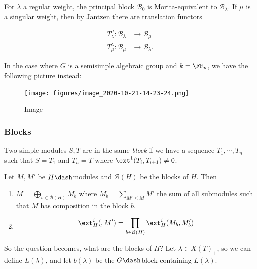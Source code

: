 For \(\lambda\) a regular weight, the principal block \(\mathcal{B}_0\)
is Morita-equivalent to \(\mathcal{B}_\lambda\). If \(\mu\) is a
singular weight, then by Jantzen there are translation functors

\begin{align*}  
T_\lambda^\mu: \mathcal{B}_\lambda &\to \mathcal{B}_\mu \\
T_\mu^\lambda: \mathcal{B}_\mu &\to \mathcal{B}_\lambda
.\end{align*}

In the case where \(G\) is a semisimple algebraic group and
\(k = \bar{\FF}_p\), we have the following picture instead:

\begin{figure}
\centering
\texttt{[image: figures/image\_2020-10-21-14-23-24.png]}
\caption{Image}
\end{figure}

\hypertarget{blocks}{%
\subsubsection{Blocks}\label{blocks}}

Two simple modules \(S, T\) are in the same \emph{block} if we have a
sequence \(T_1, \cdots, T_n\) such that \(S=T_1\) and \(T_n = T\) where
\(\ext^1(T_i, T_{i+1}) \neq 0\).

\begin{lemma}[?]

Let \(M, M'\) be \(H\dash\)modules and \(\mathcal{B}(H)\) be the blocks
of \(H\). Then

\begin{enumerate}
\def\labelenumi{\arabic{enumi}.}
\item
  \(M = \bigoplus_{b\in \mathcal{B}(H)} M_b\) where
  \(M_b = \sum_{M'\leq M} M'\) the sum of all submodules such that \(M\)
  has composition in the block \(b\).
\item

  \begin{align*} \ext_H^i(, M') = \prod_{b\in\mathcal{B}(H)} \ext_H^i (M_b, M_b') \end{align*}
\end{enumerate}

\end{lemma}

So the question becomes, what are the blocks of \(H\)? Let
\(\lambda \in X(T)_+\), so we can define \(L(\lambda)\), and let
\(b(\lambda)\) be the \(G\dash\)block containing \(L(\lambda)\).

